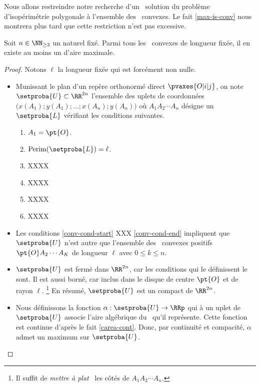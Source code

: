 Nous allons restreindre notre recherche d'un \ngone\ solution du problème d'isopérimétrie polygonale à l'ensemble des \ngones\ convexes. Le fait \ref{max-is-conv} nous montrera plus tard que cette restriction n'est pas excessive.


\begin{fact} \label{suff-cond}
    Soit $n \in \NN_{\geq3}$ un naturel fixé.
    Parmi tous les \ngones\ convexes de longueur fixée, il en existe au moins un d'aire maximale.
\end{fact}


\begin{proof}
	Notons $\ell$ la longueur fixée qui est forcément non nulle.
    \begin{itemize}
        \item Munissant le plan d'un repère orthonormé direct $\pvaxes{O | i | j}$, 
	    on note $\setproba{U} \subset \RR^{2n}$ l'ensemble des uplets de coordonnées $\big( x(A_1) ; y(A_1) ; \dots ; x(A_n) ; y(A_n) \big)$ où $A_1 A_2 \cdots A_n$ désigne un \ncycle\ $\setproba{L}$ vérifiant les conditions suivantes.
	    \begin{enumerate}
	    	\item $A_1 = \pt{O}$.
	    	\item $\perim{\setproba{L}} = \ell$.
		    \item \label{conv-cond-start}
		          XXXX
		    \item XXXX
		    \item XXXX
		    \item \label{conv-cond-end}
		          XXXX
	    \end{enumerate}


        \item Les conditions 
        \ref{conv-cond-start}
        XXX
        \ref{conv-cond-end}
        impliquent que $\setproba{U}$ n'est autre que l'ensemble des \kgones\ convexes positifs $\pt{O} A_2 \cdots A_K$ de longueur $\ell$ avec $0 \leq k \leq n$.


        \item $\setproba{U}$ est fermé dans $\RR^{2n}$, car les conditions qui le définissent le sont.
        Il est aussi borné, car inclus dans le disque de centre $\pt{O}$ et de rayon $\ell$.%
        \footnote{
        	Il suffit de \og \emph{mettre à plat} \fg\ les côtés de $A_1 A_2 \cdots A_n$.
        }
        En résumé, $\setproba{U}$ est un compact de $\RR^{2n}$.


        \item Nous définissons la fonction $\alpha: \setproba{U} \rightarrow \RRp$ qui à un uplet de $\setproba{U}$ associe l'aire algébrique du \ncycle\ qu'il représente.
        Cette fonction est continue d'après le fait \ref{carea-cont}.
        Donc, par continuité et compacité, $\alpha$ admet un maximum sur $\setproba{U}$.



\end{itemize}
\end{proof}
